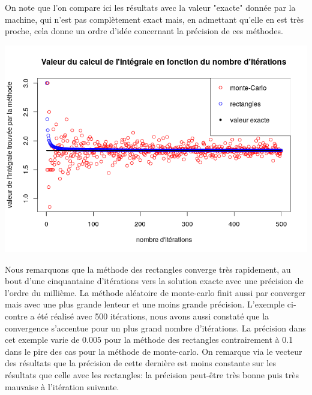 \documentclass[a4paper,10pt]{article}
\begin{document}
\vspace{1mm}
\noindent
{}

On note que l'on compare ici les résultats avec la valeur "exacte" donnée par la machine, qui n'est pas complètement exact mais, en admettant qu'elle en est très proche, cela donne un ordre d'idée concernant la précision de ces méthodes. \\
\begin{minipage}{0.5\textwidth}
\begin{flushleft}
      \includegraphics[scale=0.5]{fig/precision_iteration.png}
\end{flushleft}
\end{minipage}
\hspace{1cm}
\begin{minipage}{0.45\textwidth}
	Nous remarquons que la méthode des rectangles converge très rapidement, au bout d'une cinquantaine d'itérations vers la solution exacte avec une précision de l'ordre du millième. La méthode aléatoire de monte-carlo finit aussi par converger mais avec une plus grande lenteur et une moins grande précision. L'exemple ci-contre a été réalisé avec 500 itérations, nous avons aussi constaté que la convergence s'accentue pour un plus grand nombre d'itérations. La précision dans cet exemple varie de 0.005 pour la méthode des rectangles contrairement à 0.1 dans le pire des cas pour la méthode de monte-carlo. On remarque via le vecteur des résultats que la précision de cette dernière est moins constante sur les résultats que celle avec les rectangles: la précision peut-être très bonne puis très mauvaise à l'itération suivante.
\end{minipage}
\end{document}
